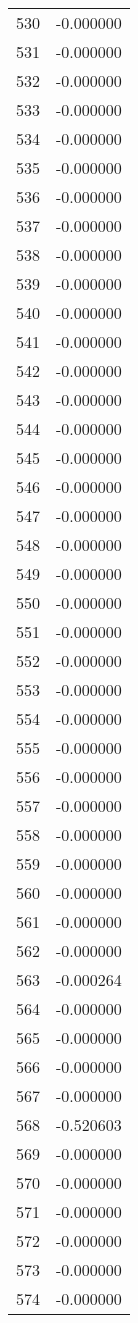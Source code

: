 \documentclass[12pt]{article}
\begin{document}
\begin{longtable}{@{}cc@{}}
530 & -0.000000 \\
531 & -0.000000 \\
532 & -0.000000 \\
533 & -0.000000 \\
534 & -0.000000 \\
535 & -0.000000 \\
536 & -0.000000 \\
537 & -0.000000 \\
538 & -0.000000 \\
539 & -0.000000 \\
540 & -0.000000 \\
541 & -0.000000 \\
542 & -0.000000 \\
543 & -0.000000 \\
544 & -0.000000 \\
545 & -0.000000 \\
546 & -0.000000 \\
547 & -0.000000 \\
548 & -0.000000 \\
549 & -0.000000 \\
550 & -0.000000 \\
551 & -0.000000 \\
552 & -0.000000 \\
553 & -0.000000 \\
554 & -0.000000 \\
555 & -0.000000 \\
556 & -0.000000 \\
557 & -0.000000 \\
558 & -0.000000 \\
559 & -0.000000 \\
560 & -0.000000 \\
561 & -0.000000 \\
562 & -0.000000 \\
563 & -0.000264 \\
564 & -0.000000 \\
565 & -0.000000 \\
566 & -0.000000 \\
567 & -0.000000 \\
568 & -0.520603 \\
569 & -0.000000 \\
570 & -0.000000 \\
571 & -0.000000 \\
572 & -0.000000 \\
573 & -0.000000 \\
574 & -0.000000 \\

\end{longtable}
\end{document}

